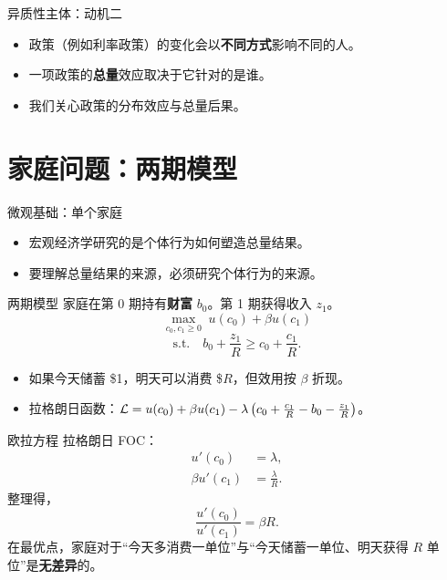 \documentclass[10pt,aspectratio=169]{beamer}
\begin{document}
\begin{frame}{异质性主体：动机二}
\begin{itemize}
  \item 政策（例如利率政策）的变化会以\textbf{不同方式}影响不同的人。
  \item 一项政策的\textbf{总量}效应取决于它针对的是谁。
  \item 我们关心政策的分布效应与总量后果。
\end{itemize}

\end{frame}

\section{家庭问题：两期模型}

\begin{frame}{微观基础：单个家庭}
  \begin{itemize}
    \item 宏观经济学研究的是个体行为如何塑造总量结果。
    \item 要理解总量结果的来源，必须研究个体行为的来源。
  \end{itemize}
\end{frame}

\begin{frame}{两期模型}
  家庭在第 0 期持有\textbf{财富} $b_0$。第 1 期获得收入 $z_1$。
  \[
    \max_{c_0, c_1 \ge 0} \; u(c_0) + \beta u(c_1)
  \]
  \[
    \text{s.t.}\quad b_0 + \frac{z_1}{R} \geq c_0 + \frac{c_1}{R}.
  \]
  \begin{itemize}
    \item 如果今天储蓄 \$1，明天可以消费 \$$R$，但效用按 $\beta$ 折现。
    \item 拉格朗日函数：$\mathcal{L} = u(c_0) + \beta u(c_1) - \lambda\left( c_0 + \frac{c_1}{R} - b_0 - \frac{z_1}{R} \right)$。
  \end{itemize}
\end{frame}

\begin{frame}{欧拉方程}
  拉格朗日 FOC：
  \begin{align*}
    u'(c_0) &= \lambda, \\
    \beta u'(c_1) &= \frac{\lambda}{R}.
  \end{align*}
  整理得，
  \[
    \boxed{\frac{u'(c_0)}{u'(c_1)} = \beta R.}
  \]
  在最优点，家庭对于``今天多消费一单位''与``今天储蓄一单位、明天获得 $R$ 单位''是\textbf{无差异}的。
\end{frame}
\end{document}

